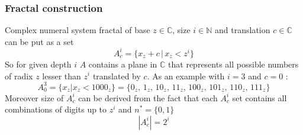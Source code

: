 \subsubsection{Fractal construction}
Complex numeral system fractal of base $z \in \mathbb{C}$, size $i\in\mathbb{N}$ and translation $c\in\mathbb{C}$ can be put as a set
\begin{equation}
    A^i_c = \{ x_z + c\, |\, x_z < z^i\}
\end{equation}
So for given depth $i$ $A$ contains a plane in $\mathbb{C}$ that represents all possible numbers of radix $z$ lesser than
$z^i$ translated by $c$. As an example with $i = 3$ and $c = 0$ :
\[
    A^3_0 = \{x_z | x_z < 1000_z\} = \{0_z,\,1_z,\,10_z,\,11_z,\,100_z,\,101_z,\,110_z,\,111_z\}
\]
Moreover size of $A^i_c$ can be derived from the fact that each $A^i_c$ set contains all combinations of digits 
up to $z^i$ and $n^* = \{0,1\}$  
\begin{equation}
   |A^i_c| = 2^i 
\end{equation}
